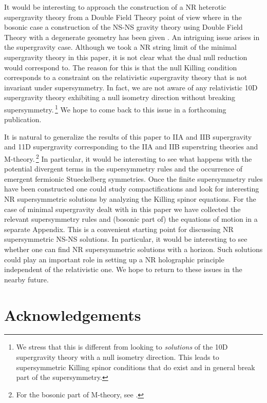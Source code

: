 \documentclass[a4paper,10pt,openany]{article}
\begin{document}
	It would be interesting to approach the construction of a NR heterotic supergravity theory from a Double Field Theory point of view where in the bosonic case a construction of the NS-NS gravity theory using Double Field Theory with  a degenerate geometry has been given \cite{Gallegos:2020egk}. An intriguing issue arises in the supergravity case. Although we took a NR string limit of the minimal supergravity theory in this paper, it is not clear what the dual null reduction  would correspond to. The reason for this is that the null Killing condition corresponds to a constraint on the relativistic supergravity theory that is not invariant under supersymmetry. In fact, we are not aware of any relativistic 10D supergravity theory exhibiting a null isometry direction without breaking supersymmetry.\,\footnote{We stress that this is different from looking to {\sl solutions} of the 10D supergravity theory with a null isometry direction. This leads to supersymmetric Killing spinor conditions that do exist and in general break part of the supersymmetry. }
	We hope to come back to this issue in a forthcoming publication.
	
	It is natural to generalize the results of this paper to IIA and IIB supergravity and 11D supergravity corresponding to the IIA and IIB  superstring theories and M-theory.\,\footnote{For the bosonic part of M-theory, see \cite{Blair:2021ycc}.} In particular, it would be interesting to see what happens with the potential divergent terms in the supersymmetry rules and the occurrence of emergent fermionic Stueckelberg symmetries. Once the finite supersymmetry rules have been constructed one could study  compactifications and look for interesting NR supersymmetric solutions by analyzing the Killing spinor equations. For the case of minimal supergravity dealt with in this paper we have collected the relevant supersymmetry rules and (bosonic part of) the equations of motion in a separate Appendix. This is a convenient starting point for discussing NR supersymmetric NS-NS solutions. In particular, it would be interesting to see whether one can find NR supersymmetric solutions with a horizon. Such solutions could play an important role in setting up a NR holographic principle independent of the relativistic one. We hope to return to these issues in the nearby future.
	
	
	\section*{Acknowledgements}
	
\end{document}
